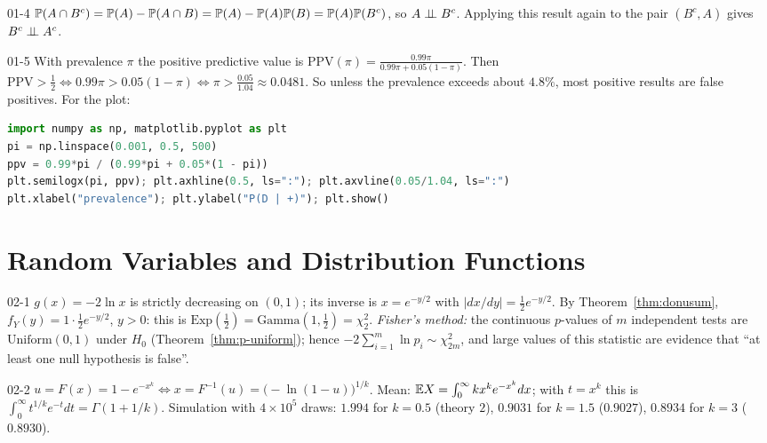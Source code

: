 \begin{solution}{01-4}
$\P(A\cap B^c)=\P(A)-\P(A\cap B)=\P(A)-\P(A)\P(B)=\P(A)\P(B^c)$, so $A\indep B^c$. Applying this result again to the pair $(B^c,A)$ gives $B^c\indep A^c$.
\end{solution}

\begin{solution}{01-5}
With prevalence $\pi$ the positive predictive value is $\mathrm{PPV}(\pi)=\frac{0.99\pi}{0.99\pi+0.05(1-\pi)}$. Then $\mathrm{PPV}>\frac12\iff0.99\pi>0.05(1-\pi)\iff\pi>\frac{0.05}{1.04}\approx0.0481$. So unless the prevalence exceeds about $4.8\%$, most positive results are false positives. For the plot:
\begin{lstlisting}[language=Python]
import numpy as np, matplotlib.pyplot as plt
pi = np.linspace(0.001, 0.5, 500)
ppv = 0.99*pi / (0.99*pi + 0.05*(1 - pi))
plt.semilogx(pi, ppv); plt.axhline(0.5, ls=":"); plt.axvline(0.05/1.04, ls=":")
plt.xlabel("prevalence"); plt.ylabel("P(D | +)"); plt.show()
\end{lstlisting}
\end{solution}

\section{Random Variables and Distribution Functions}

\begin{solution}{02-1}
$g(x)=-2\ln x$ is strictly decreasing on $(0,1)$; its inverse is $x=e^{-y/2}$ with $|dx/dy|=\frac12e^{-y/2}$. By Theorem~\ref{thm:donusum}, $f_Y(y)=1\cdot\frac12e^{-y/2}$, $y>0$: this is $\text{Exp}(\tfrac12)=\text{Gamma}(1,\tfrac12)=\chi^2_2$.
\emph{Fisher's method:} the continuous $p$-values of $m$ independent tests are $\text{Uniform}(0,1)$ under $H_0$ (Theorem~\ref{thm:p-uniform}); hence $-2\sum_{i=1}^m\ln p_i\sim\chi^2_{2m}$, and large values of this statistic are evidence that ``at least one null hypothesis is false''.
\end{solution}

\begin{solution}{02-2}
$u=F(x)=1-e^{-x^k}\iff x=F^{-1}(u)=\big(-\ln(1-u)\big)^{1/k}$. Mean: $\E X=\int_0^\infty kx^ke^{-x^k}dx$; with $t=x^k$ this is $\int_0^\infty t^{1/k}e^{-t}dt=\Gamma(1+1/k)$. Simulation with $4\times10^5$ draws: $1.994$ for $k=0.5$ (theory $2$), $0.9031$ for $k=1.5$ ($0.9027$), $0.8934$ for $k=3$ ($0.8930$).
\end{solution}

